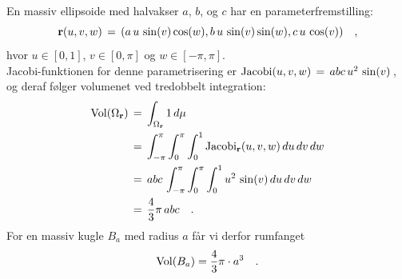 \begin{example} \label{exampEllipRumf}
En massiv {ellipsoide} med halvakser $a$, $b$, og $c$ har en parameterfremstilling:
\begin{equation}
{\bf r}(u, v, w) \, = \, (a\,u\,\sin(v)\cos(w), b\,u\,\sin(v)\sin(w),
c\,u\,\cos(v) ) \quad ,
\end{equation}
hvor $u \in [0,1]$, $ v \in [0,
\pi]$ og $ w \in [-\pi, \pi]$.\\

Jacobi-funktionen for denne parametrisering er $\operatorname{Jacobi}(u,v,w) \, = \, abc\,u^{2}\,\sin(v)\,$, og deraf følger
volumenet ved tredobbelt integration:
\begin{equation} \label{eqRumintegralVolumen02}
\begin{aligned}
\operatorname{Vol}(\Omega_{\bf r}) \, &= \, \int_{\Omega_{\bf r}} 1 \, d\mu \\ &=
\, \int_{-\pi}^{\pi}\int_{0}^{\pi} \int_{0}^{1} \operatorname{Jacobi}_{\bf r}(u,v,w)\,du
\, dv \, dw  \\ &= \, abc\,\int_{-\pi}^{\pi}\int_{0}^{\pi} \int_{0}^{1} u^{2}\,\sin(v)\,du
\, dv \, dw \\ &=
\, \frac{4}{3}\pi\,abc \quad .
\end{aligned}
\end{equation}
For en massiv kugle $B_{a}$ med radius $a$ får vi derfor rumfanget
\begin{equation}
\operatorname{Vol}(B_{a}) = \frac{4}{3}\pi\cdot a^{3} \quad .
\end{equation}
\end{example}


